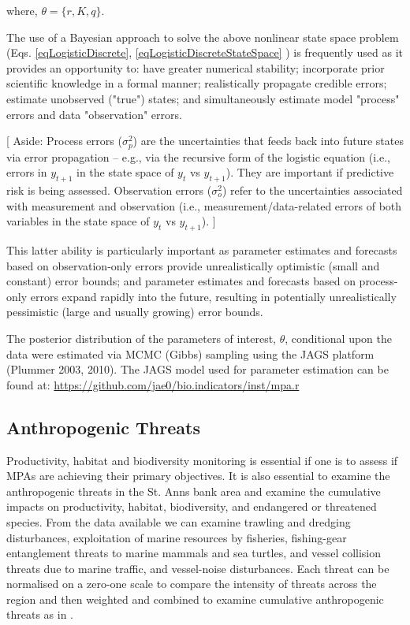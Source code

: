 \documentclass[letterpaper,portrait,11pt]{scrartcl}
\numberwithin{equation}{section}		%
\numberwithin{figure}{section}		%
\numberwithin{table}{section}				%
\begin{document}
where, $\theta=\{r,K,q\}$.

The use of a Bayesian approach to solve the above nonlinear state space problem (Eqs. \ref{eqLogisticDiscrete}, \ref{eqLogisticDiscreteStateSpace} ) is frequently used as it provides an opportunity to: have greater numerical stability; incorporate prior scientific knowledge in a formal manner; realistically propagate credible errors; estimate unobserved ("true") states; and simultaneously estimate model "process" errors and data "observation" errors. 

[ Aside: Process errors ($\sigma^2_p$) are the uncertainties that feeds back into future states via error propagation -- e.g., via the recursive form of the logistic equation (i.e., errors in $y_{t+1}$ in the state space of $y_t$ vs $y_{t+1}$). They are important if predictive risk is being assessed. Observation errors ($\sigma^2_o$) refer to the uncertainties associated with measurement and observation (i.e., measurement/data-related errors of both variables in the state space of $y_t$ vs $y_{t+1}$). ]

This latter ability is particularly important as parameter estimates and forecasts based on observation-only errors provide unrealistically optimistic (small and constant) error bounds; and parameter estimates and forecasts based on process-only errors expand rapidly into the future, resulting in potentially unrealistically pessimistic (large and usually growing) error bounds.

The posterior distribution of the parameters of interest, $\theta$, conditional upon the data were estimated via MCMC (Gibbs) sampling using the JAGS platform (Plummer 2003, 2010). The JAGS model used for parameter estimation can be found at: \url{https://github.com/jae0/bio.indicators/inst/mpa.r}

\subsection{Anthropogenic Threats}
Productivity, habitat and biodiversity monitoring is essential if one is to assess if MPAs are achieving their primary objectives. It is also essential to examine the anthropogenic threats in the St. Anns bank area and examine the cumulative impacts on productivity, habitat, biodiversity, and endangered or threatened species. From the data available we can examine trawling and dredging disturbances, exploitation of marine resources by fisheries, fishing-gear entanglement threats to marine mammals and sea turtles, and vessel collision threats due to marine traffic, and vessel-noise disturbances. Each threat can be normalised on a zero-one scale to compare the intensity of threats across the region and then weighted and combined to examine cumulative anthropogenic threats as in \textcite{coll:2012:mediterranean}.
\end{document}
